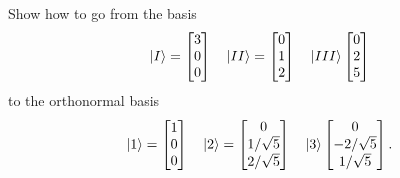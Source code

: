 \begin{exercise}
Show how to go from the basis
\begin{equation*}
    \ket{I} = 
    \begin{bmatrix}
    3 \\
    0 \\
    0
    \end{bmatrix}
    \quad
    \ket{II} = 
    \begin{bmatrix}
    0 \\
    1 \\
    2
    \end{bmatrix}
    \quad
    \ket{III}
    \begin{bmatrix}
    0 \\
    2 \\
    5
    \end{bmatrix}
\end{equation*}
to the orthonormal basis
\begin{equation*}
    \ket{1} = 
    \begin{bmatrix}
    1 \\
    0 \\
    0
    \end{bmatrix}
    \quad
    \ket{2} = 
    \begin{bmatrix}
    0 \\
    1/\sqrt{5} \\
    2/\sqrt{5}
    \end{bmatrix}
    \quad
    \ket{3}
    \begin{bmatrix}
    0 \\
    -2/\sqrt{5} \\
    1/\sqrt{5}
    \end{bmatrix}.
\end{equation*}
\end{exercise}

